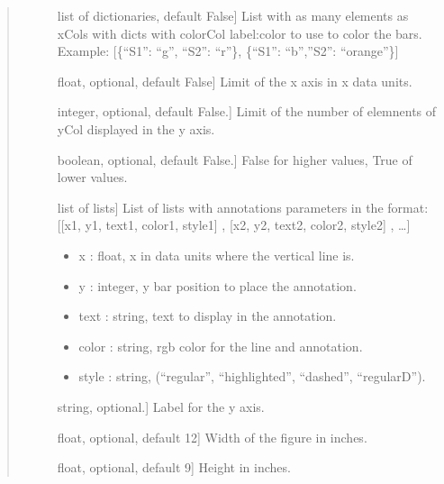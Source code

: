 \documentclass[letterpaper,10pt,english]{sphinxmanual}
\begin{document}
\begin{fulllineitems}
\begin{quote}
\begin{description}
\begin{description}
\item[{}] \leavevmode{[}list of dictionaries, default False{]}
List with as many elements as xCols
with dicts with colorCol label:color to use to color the bars.
Example: {[}\{“S1”: “g”, “S2”: “r”\}, \{“S1”: “b”,”S2”: “orange”\}{]}

\item[{}] \leavevmode{[}float, optional, default False{]}
Limit of the x axis in x data units.

\item[{}] \leavevmode{[}integer, optional, default False.{]}
Limit of the number of elemnents of yCol 
displayed in the y axis.

\item[{}] \leavevmode{[}boolean, optional, default False.{]}
False for higher values, True of lower values.

\item[{}] \leavevmode{[}list of lists{]}
List of lists with annotations parameters in the format:
{[}{[}x1, y1, text1, color1, style1{]} , 
{[}x2, y2, text2, color2, style2{]} , …{]}
\begin{itemize}
\item {} 
x : float, x in data units where the vertical line is.

\item {} 
y : integer, y bar position to place the annotation.

\item {} 
text : string, text to display in the annotation.

\item {} 
color : string, rgb color for the line and annotation.

\item {} 
style : string, (“regular”, “highlighted”, “dashed”, “regularD”).

\end{itemize}

\item[{}] \leavevmode{[}string, optional.{]}
Label for the y axis.

\item[{}] \leavevmode{[}float, optional, default 12{]}
Width of the figure in inches.

\item[{}] \leavevmode{[}float, optional, default 9{]}
Height in inches.


\end{description}
\end{description}
\end{quote}
\end{fulllineitems}
\end{document}
